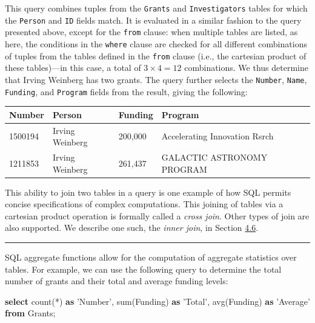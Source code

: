 \documentclass[]{krantz}
\newenvironment{Shaded}{\begin{snugshade}}{\end{snugshade}}
\newcommand{\KeywordTok}[1]{\textcolor[rgb]{0.13,0.29,0.53}{\textbf{#1}}}
\newcommand{\StringTok}[1]{\textcolor[rgb]{0.31,0.60,0.02}{#1}}
\newcommand{\FunctionTok}[1]{\textcolor[rgb]{0.00,0.00,0.00}{#1}}
\newcommand{\NormalTok}[1]{#1}
\begin{document}
This query combines tuples from the \texttt{Grants} and
\texttt{Investigators} tables for which the \texttt{Person} and
\texttt{ID} fields match. It is evaluated in a similar fashion to the
query presented above, except for the \texttt{from} clause: when
multiple tables are listed, as here, the conditions in the
\texttt{where} clause are checked for all different combinations of
tuples from the tables defined in the \texttt{from} clause (i.e., the
cartesian product of these tables)---in this case, a total of
\(3\times 4 = 12\) combinations. We thus determine that Irving Weinberg
has two grants. The query further selects the \texttt{Number},
\texttt{Name}, \texttt{Funding}, and \texttt{Program} fields from the
result, giving the following:

\begin{longtable}[]{@{}llll@{}}
\toprule
\textbf{Number} & \textbf{Person} & \textbf{Funding} &
\textbf{Program}\tabularnewline
\midrule
\endhead
1500194 & Irving Weinberg & 200,000 & Accelerating Innovation
Rsrch\tabularnewline
1211853 & Irving Weinberg & 261,437 & GALACTIC ASTRONOMY
PROGRAM\tabularnewline
\bottomrule
\end{longtable}

This ability to join two tables in a query is one example of how SQL
permits concise specifications of complex computations. This joining of
tables via a cartesian product operation is formally called a
\emph{cross join}. Other types of join are also supported. We describe
one such, the \emph{inner join}, in Section
\protect\hyperlink{sec:db:spatial}{4.6}.

\begin{center}\rule{0.5\linewidth}{\linethickness}\end{center}

SQL aggregate functions allow for the computation of aggregate
statistics over tables. For example, we can use the following query to
determine the total number of grants and their total and average funding
levels:

\begin{Shaded}
\begin{Highlighting}[]
\KeywordTok{select} \FunctionTok{count}\NormalTok{(*) }\KeywordTok{as} \StringTok{'Number'}\NormalTok{, }\FunctionTok{sum}\NormalTok{(Funding) }\KeywordTok{as} \StringTok{'Total'}\NormalTok{,}
       \FunctionTok{avg}\NormalTok{(Funding) }\KeywordTok{as} \StringTok{'Average'}
\KeywordTok{from}\NormalTok{ Grants;}
\end{Highlighting}
\end{Shaded}
\end{document}
